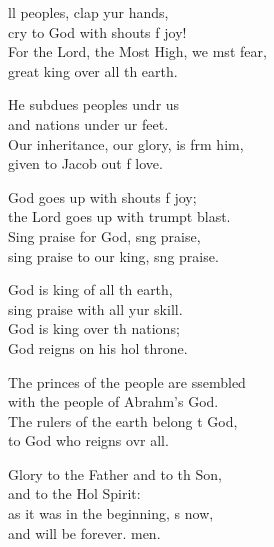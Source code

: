 \settowidth{\versewidth}{For the Lord, the Most High, we must fear, *}
\begin{psalmverse}%
  \begin{patverse}
    ll peoples, clap yur hands,\Med\\
cry to God with shouts f joy!\\
For the Lord, the Most High, we mst fear,\Med\\
great king over all th earth.

He subdues peoples undr us\Med\\
and nations under ur feet.\\
Our inheritance, our glory, is frm him,\Med\\
given to Jacob out f love.

God goes up with shouts f joy;\Med\\
the Lord goes up with trumpt blast.\\
Sing praise for God, s\pointup{\i}ng praise,\Med\\
sing praise to our king, s\pointup{\i}ng praise.

God is king of all th earth,\Med\\
sing praise with all yur skill.\\
God is king over th nations;\Med\\
God reigns on his hol throne.

The princes of the people are ssembled\Med\\
with the people of Abrahm’s God.\\
The rulers of the earth belong t God,\Med\\
to God who reigns ovr all.

Glory to the Father and to th Son,\Med\\
and to the Hol Spirit:\\
as it was in the beginning, \pointup{\i}s now,\Med\\
and will be forever. men. 
  \end{patverse}
\end{psalmverse}
